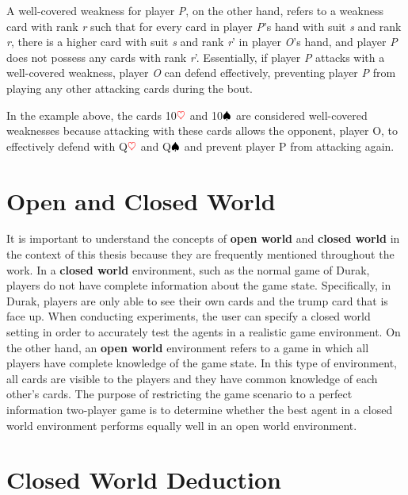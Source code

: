 A well-covered weakness for player \textit{P}, on the other hand, refers to a weakness card with rank \textit{r} such that for every card in player \textit{P}'s hand with suit \textit{s} and rank \textit{r}, there is a higher card with suit \textit{s} and rank \textit{r}' in player \textit{O}'s hand, and player \textit{P} does not possess any cards with rank \textit{r}'. Essentially, if player \textit{P} attacks with a well-covered weakness, player \textit{O} can defend effectively, preventing player \textit{P} from playing any other attacking cards during the bout.

In the example above, the cards 10$\textcolor{red}{\heartsuit}$ and 10$\textcolor{black}{\spadesuit}$ are considered well-covered weaknesses because attacking with these cards allows the opponent, player O, to effectively defend with Q$\textcolor{red}{\heartsuit}$ and Q$\textcolor{black}{\spadesuit}$ and prevent player P from attacking again.

\section{Open and Closed World}

It is important to understand the concepts of \textbf{open world} and \textbf{closed world} in the context of this thesis because they are frequently mentioned throughout the work. In a \textbf{closed world} environment, such as the normal game of Durak, players do not have complete information about the game state. Specifically, in Durak, players are only able to see their own cards and the trump card that is face up. When conducting experiments, the user can specify a closed world setting in order to accurately test the agents in a realistic game environment. On the other hand, an \textbf{open world} environment refers to a game in which all players have complete knowledge of the game state. In this type of environment, all cards are visible to the players and they have common knowledge of each other's cards. The purpose of restricting the game scenario to a perfect information two-player game is to determine whether the best agent in a closed world environment performs equally well in an open world environment.

\section{Closed World Deduction}

